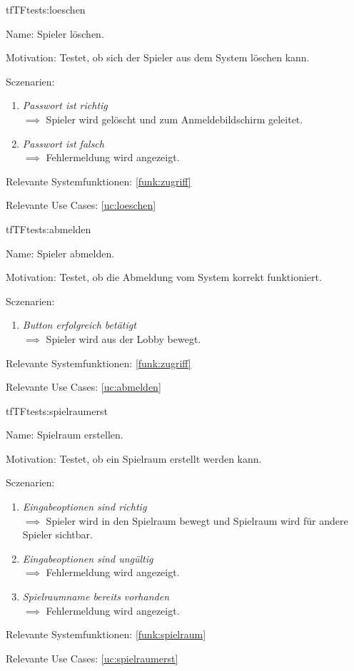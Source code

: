 \begin{description}[leftmargin=5em, style=sameline]
\begin{lhp}{tf}{TF}{tests:loeschen}
	\item [Name:] Spieler löschen.
	\item [Motivation:] Testet, ob sich der Spieler aus dem System löschen kann.
	\item [Sczenarien:] \hfill
	\begin{enumerate}
		\item \textit{Passwort ist richtig} \\ $\implies$ Spieler wird gelöscht und zum Anmeldebildschirm geleitet.
		\item \textit{Passwort ist falsch} \\ $\implies$ Fehlermeldung wird angezeigt.
	\end{enumerate}
	\item [Relevante Systemfunktionen:] \ref{funk:zugriff}
	\item [Relevante Use Cases:] \ref{uc:loeschen}
\end{lhp}

\begin{lhp}{tf}{TF}{tests:abmelden}
	\item [Name:] Spieler abmelden.
	\item [Motivation:] Testet, ob die Abmeldung vom System korrekt funktioniert.
	\item [Sczenarien:] \hfill
	\begin{enumerate}
		\item \textit{Button erfolgreich betätigt} \\ $\implies$ Spieler wird aus der Lobby bewegt.
	\end{enumerate}
	\item [Relevante Systemfunktionen:] \ref{funk:zugriff}
	\item [Relevante Use Cases:] \ref{uc:abmelden}
\end{lhp}

\begin{lhp}{tf}{TF}{tests:spielraumerst}
	\item [Name:] Spielraum erstellen.
	\item [Motivation:] Testet, ob ein Spielraum erstellt werden kann.
	\item [Sczenarien:] \hfill
	\begin{enumerate}
		\item \textit{Eingabeoptionen sind richtig} \\ $\implies$ Spieler wird in den Spielraum bewegt und Spielraum wird für andere Spieler sichtbar.
		\item \textit{Eingabeoptionen sind ungültig} \\ $\implies$ Fehlermeldung wird angezeigt.
		\item \textit{Spielraumname bereits vorhanden} \\ $\implies$ Fehlermeldung wird angezeigt.
	\end{enumerate}
	\item [Relevante Systemfunktionen:] \ref{funk:spielraum}
	\item [Relevante Use Cases:] \ref{uc:spielraumerst}
\end{lhp}


\end{description}
